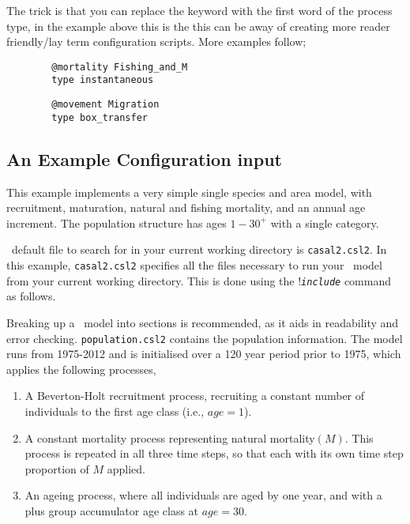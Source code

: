 The trick is that you can replace the keyword  with the first word of the process type, in the example above this is the  this can be away of creating more reader friendly/lay term configuration scripts. More examples follow;

{\small{\begin{verbatim}
		@mortality Fishing_and_M
		type instantaneous
		\end{verbatim}}}

{\small{\begin{verbatim}
		@movement Migration
		type box_transfer
		\end{verbatim}}}

\subsection{An Example Configuration input}
This example implements a very simple single species and area model, with recruitment, maturation, natural and fishing mortality, and an annual age increment. The population structure has ages $1-30^{+}$ with a single category.

\IBM\ default file to search for in your current working directory is \texttt{casal2.csl2}. In this example, \texttt{casal2.csl2} specifies all the files necessary to run your \IBM\ model from your current working directory. This is done using the !\texttt{\emph{include}} command as follows.
% 

Breaking up a \IBM\ model into sections is recommended, as it aids in readability and error checking. \texttt{population.csl2} contains the population information. The model runs from 1975-2012 and is initialised over a 120 year period prior to  1975, which applies the following processes,

\begin{enumerate}
	\item A Beverton-Holt recruitment process, recruiting a constant number of individuals to the first age class (i.e., $age=1$).
	\item A constant mortality process representing natural mortality$(M)$. This process is repeated in all three time steps, so that each with its own time step proportion of $M$ applied.
	
	\item An ageing process, where all individuals are aged by one year, and with a plus group accumulator age class at $age=30$.
\end{enumerate}

